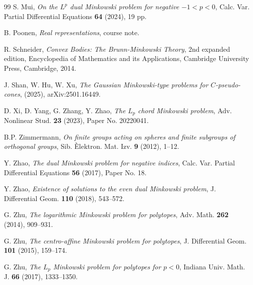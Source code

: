 \documentclass[12pt, reqno]{amsart}
\theoremstyle{definition}
\theoremstyle{remark}
\numberwithin{equation}{section}
\newcommand{\Lp}{L_{p}}
\begin{document}
\begin{thebibliography}{99}
			S. Mui, \emph{On the $L^{p}$ dual Minkowski problem for negative $-1<p<0$}, Calc. Var. Partial Differential
			Equations \textbf{64} (2024), 19 pp.
			
			
		B. Poonen,	\emph{Real representations}, course note.
		
		
			 R. Schneider,
		\textit{Convex Bodies: The Brunn-Minkowski Theory}, 2nd expanded edition, Encyclopedia of Mathematics and
		its Applications, Cambridge University Press, 
		Cambridge, 2014.
		
		
		J. Shan, W. Hu, W. Xu,  \emph{The Gaussian Minkowski-type problems for $C$-pseudo-cones}, (2025),	arXiv:2501.16449.
		
			
			D. Xi, D. Yang, G. Zhang, Y. Zhao, \emph{The $\Lp$ chord Minkowski problem}, Adv. Nonlinear Stud. \textbf{23} (2023),
		 Paper No. 20220041.
			
			
			B.P. Zimmermann, \emph{On finite groups acting on spheres and finite subgroups of orthogonal groups}, Sib.
			\`{E}lektron. Mat. Izv. \textbf{9} (2012), 1--12.
			
			
			Y. Zhao, \emph{The dual Minkowski problem for negative indices}, Calc. Var. Partial Differential Equations
			\textbf{56 } (2017),  Paper No. 18.
			
			 Y. Zhao, \emph{Existence of solutions to the even dual Minkowski problem}, J. Differential Geom. 
			 \textbf{110} (2018), 543--572.
			
			
			
			
			
			
			G. Zhu, \emph{The logarithmic Minkowski problem for polytopes}, Adv. Math. \textbf{262} (2014), 909--931.
			
			
			G. Zhu, \emph{The centro-affine Minkowski problem for polytopes}, J. Differential Geom. \textbf{101} (2015),
			159--174.
			
			G. Zhu, \emph{The $\Lp$ Minkowski problem for polytopes for $p<0$}, Indiana Univ. Math. J. \textbf{66} (2017), 1333--1350.
			
		\end{thebibliography}
		
		
	
		
	
	
		
		
		
		
	
		
		
		
		
\end{document}
